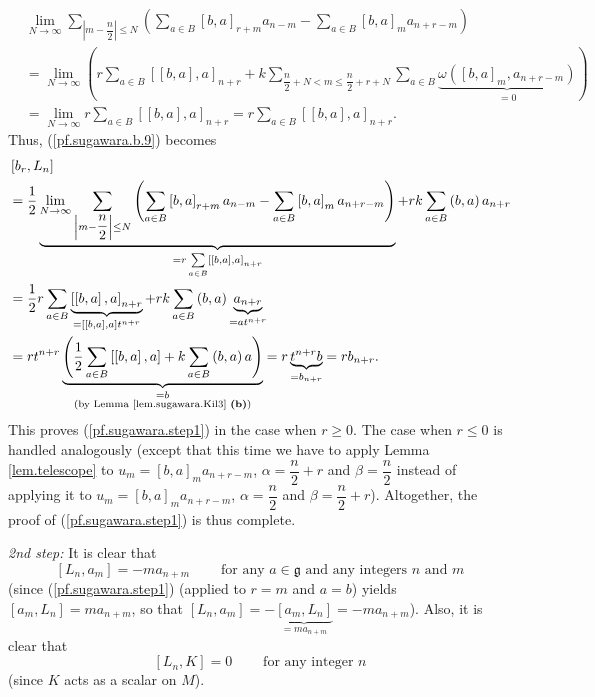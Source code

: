 \documentclass[etingof-lie.tex]{subfiles}
\begin{document}
\begin{align*}
&  \lim\limits_{N\rightarrow\infty}\sum\limits_{\left\vert m-\dfrac{n}%
{2}\right\vert \leq N}\left(  \sum\limits_{a\in B}\left[  b,a\right]
_{r+m}a_{n-m}-\sum\limits_{a\in B}\left[  b,a\right]  _{m}a_{n+r-m}\right) \\
&  =\lim\limits_{N\rightarrow\infty}\left(  r\sum\limits_{a\in B}\left[
\left[  b,a\right]  ,a\right]  _{n+r}+k\sum\limits_{\dfrac{n}{2}+N<m\leq
\dfrac{n}{2}+r+N}\sum\limits_{a\in B}\underbrace{\omega\left(  \left[
b,a\right]  _{m},a_{n+r-m}\right)  }_{=0}\right) \\
&  =\lim\limits_{N\rightarrow\infty}r\sum\limits_{a\in B}\left[  \left[
b,a\right]  ,a\right]  _{n+r}=r\sum\limits_{a\in B}\left[  \left[  b,a\right]
,a\right]  _{n+r}.
\end{align*}
Thus, (\ref{pf.sugawara.b.9}) becomes%
\begin{align*}
&  \left[  b_{r},L_{n}\right] \\
&  =\dfrac{1}{2}\underbrace{\lim\limits_{N\rightarrow\infty}\sum
\limits_{\left\vert m-\dfrac{n}{2}\right\vert \leq N}\left(  \sum\limits_{a\in
B}\left[  b,a\right]  _{r+m}a_{n-m}-\sum\limits_{a\in B}\left[  b,a\right]
_{m}a_{n+r-m}\right)  }_{=r\sum\limits_{a\in B}\left[  \left[  b,a\right]
,a\right]  _{n+r}}+rk\sum\limits_{a\in B}\left(  b,a\right)  a_{n+r}\\
&  =\dfrac{1}{2}r\sum\limits_{a\in B}\underbrace{\left[  \left[  b,a\right]
,a\right]  _{n+r}}_{=\left[  \left[  b,a\right]  ,a\right]  t^{n+r}}%
+rk\sum\limits_{a\in B}\left(  b,a\right)  \underbrace{a_{n+r}}_{=at^{n+r}}\\
&  =rt^{n+r}\underbrace{\left(  \dfrac{1}{2}\sum\limits_{a\in B}\left[
\left[  b,a\right]  ,a\right]  +k\sum\limits_{a\in B}\left(  b,a\right)
a\right)  }_{\substack{=b\\\text{(by Lemma \ref{lem.sugawara.Kil3}
\textbf{(b)})}}}=r\underbrace{t^{n+r}b}_{=b_{n+r}}=rb_{n+r}.
\end{align*}
This proves (\ref{pf.sugawara.step1}) in the case when $r\geq0$. The case when
$r\leq0$ is handled analogously (except that this time we have to apply Lemma
\ref{lem.telescope} to $u_{m}=\left[  b,a\right]  _{m}a_{n+r-m}$,
$\alpha=\dfrac{n}{2}+r$ and $\beta=\dfrac{n}{2}$ instead of applying it to
$u_{m}=\left[  b,a\right]  _{m}a_{n+r-m}$, $\alpha=\dfrac{n}{2}$ and
$\beta=\dfrac{n}{2}+r$). Altogether, the proof of (\ref{pf.sugawara.step1}) is
thus complete.

\textit{2nd step:} It is clear that%
\begin{equation}
\left[  L_{n},a_{m}\right]  =-ma_{n+m}\ \ \ \ \ \ \ \ \ \ \text{for any }%
a\in\mathfrak{g}\text{ and any integers }n\text{ and }m
\label{pf.sugawara.step2.am}%
\end{equation}
(since (\ref{pf.sugawara.step1}) (applied to $r=m$ and $a=b$) yields $\left[
a_{m},L_{n}\right]  =ma_{n+m}$, so that $\left[  L_{n},a_{m}\right]
=-\underbrace{\left[  a_{m},L_{n}\right]  }_{=ma_{n+m}}=-ma_{n+m}$). Also, it
is clear that%
\begin{equation}
\left[  L_{n},K\right]  =0\ \ \ \ \ \ \ \ \ \ \text{for any integer }n
\label{pf.sugawara.step2.K}%
\end{equation}
(since $K$ acts as a scalar on $M$).
\end{document}
